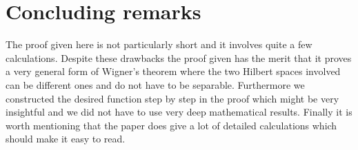 \section{Concluding remarks}
The proof given here is not particularly short and it involves quite a few calculations. Despite these drawbacks the proof given has the merit that it proves a very general form of Wigner's theorem where the two Hilbert spaces involved can be different ones and do not have to be separable. Furthermore we constructed the desired function step by step in the proof which might be very insightful and we did not have to use very deep mathematical results. Finally it is worth mentioning that the paper does give a lot of detailed calculations which should make it easy to read.